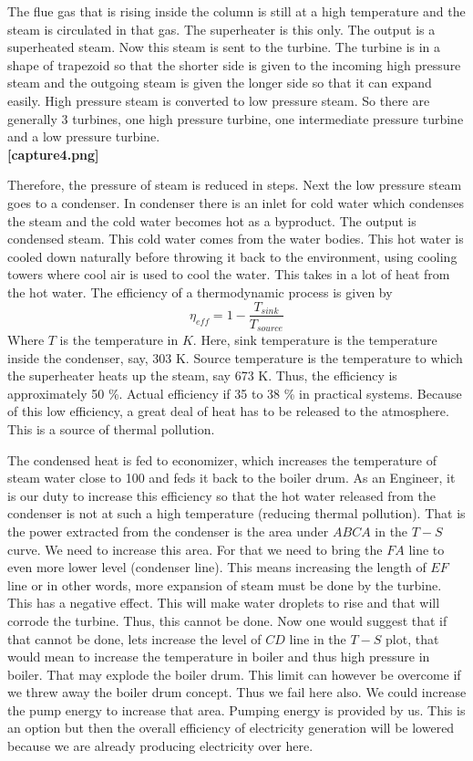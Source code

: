 \documentclass{report}
\begin{document}
\par The flue gas that is rising inside the column is still at a high temperature and the steam is circulated in that gas. The superheater is this only. The output is a superheated steam. Now this steam is sent to the turbine.  The turbine is in a shape of trapezoid so that the shorter side is given to the incoming high pressure steam and the outgoing steam is given the longer side so that it can expand easily. High pressure steam is converted to low pressure steam. So there are generally 3 turbines, one high pressure turbine, one intermediate pressure turbine and a low pressure turbine. 
\\ {\bf [capture4.png]}
\par Therefore, the pressure of steam is reduced in steps. Next the low pressure steam goes to a condenser. In condenser there is an inlet for cold water which condenses the steam and the cold water becomes hot as a byproduct. The output is condensed steam. This cold water comes from the water bodies. This hot water is cooled down naturally before throwing it back to the environment, using cooling towers where cool air is used to cool the water. This takes in a lot of heat from the hot water. 
The efficiency of a thermodynamic process is given by
\begin{equation}
\displaystyle \eta_{eff} = 1 - \frac{T_{sink}}{T_{source}}
\end{equation}
Where $T$ is the temperature in $K$. Here, sink temperature is the temperature inside the condenser, say, 303 K. Source temperature is the temperature to which the superheater heats up the steam, say 673 K. Thus, the efficiency is  approximately 50 \%. Actual efficiency if 35 to 38 \% in practical systems. Because of this low efficiency, a great deal of heat has to be released to the atmosphere. This is a source of thermal pollution. 

\par The condensed heat is fed to economizer, which increases the temperature of steam water close to 100 and feds it back to the boiler drum. As an Engineer, it is our duty to increase this efficiency so that the hot water released from the condenser is not at such a high temperature (reducing thermal pollution). That is the power extracted from the condenser is the area under $ABCA$ in the $T-S$ curve. We need to increase this area. For that we need to bring the $FA$ line to even more lower level (condenser line). This means increasing the length of $EF$ line or in other words,  more expansion of steam must be done by the turbine. This has a negative effect. This will make water droplets to rise and that will corrode the turbine. Thus, this cannot be done. Now one would suggest that if that cannot be done, lets increase the level of $CD$ line in the $T-S$ plot, that would mean to increase the temperature in boiler and thus high pressure in boiler. That may explode the boiler drum.  This limit can however be overcome if we threw away the boiler drum concept. Thus we fail here also. We could increase the pump energy to increase that area. Pumping energy is provided by us. This is an option but then the overall efficiency of electricity generation will be lowered because we are already producing electricity over here.
\end{document}

